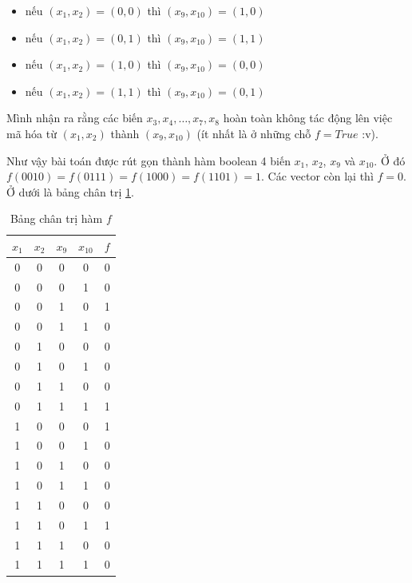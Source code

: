 \begin{itemize}
    \item nếu $(x_1, x_2) = (0, 0)$ thì $(x_9, x_{10}) = (1, 0)$
    \item nếu $(x_1, x_2) = (0, 1)$ thì $(x_9, x_{10}) = (1, 1)$
    \item nếu $(x_1, x_2) = (1, 0)$ thì $(x_9, x_{10}) = (0, 0)$
    \item nếu $(x_1, x_2) = (1, 1)$ thì $(x_9, x_{10}) = (0, 1)$
\end{itemize}

Mình nhận ra rằng các biến $x_3, x_4, \ldots, x_7, x_8$ hoàn toàn không tác động lên việc mã hóa từ $(x_1, x_2)$ thành $(x_9, x_{10})$ (ít nhất là ở những chỗ $f = True$ :v).

Như vậy bài toán được rút gọn thành hàm boolean 4 biến $x_1$, $x_2$, $x_9$ và $x_{10}$. Ở đó $f(0010) = f(0111) = f(1000) = f(1101) = 1$. Các vector còn lại thì $f=0$. Ở dưới là bảng chân trị \ref{nsucrypto23:prob11}.

\begin{table}[ht]
    \centering
    \begin{tabular}{|c|c|c|c|c|}
        \hline
        $x_1$ & $x_2$ & $x_9$ & $x_{10}$ & $f$ \\ \hline
        0 & 0 & 0 & 0 & 0 \\ \hline
        0 & 0 & 0 & 1 & 0 \\ \hline
        0 & 0 & 1 & 0 & 1 \\ \hline
        0 & 0 & 1 & 1 & 0 \\ \hline
        0 & 1 & 0 & 0 & 0 \\ \hline
        0 & 1 & 0 & 1 & 0 \\ \hline
        0 & 1 & 1 & 0 & 0 \\ \hline
        0 & 1 & 1 & 1 & 1 \\ \hline
        1 & 0 & 0 & 0 & 1 \\ \hline
        1 & 0 & 0 & 1 & 0 \\ \hline
        1 & 0 & 1 & 0 & 0 \\ \hline
        1 & 0 & 1 & 1 & 0 \\ \hline
        1 & 1 & 0 & 0 & 0 \\ \hline
        1 & 1 & 0 & 1 & 1 \\ \hline
        1 & 1 & 1 & 0 & 0 \\ \hline
        1 & 1 & 1 & 1 & 0 \\ \hline
    \end{tabular}
    \caption{Bảng chân trị hàm $f$}
    \label{nsucrypto23:prob11}
\end{table}

